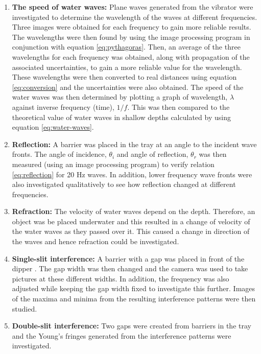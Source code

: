 \documentclass{article}
\begin{document}
\begin{enumerate}
  \item \textbf{The speed of water waves:} Plane waves generated from the vibrator were investigated to determine the wavelength of the waves at different frequencies. Three images were obtained for each frequency to gain more reliable results. The wavelengths were then found by using the image processing program in conjunction with equation \eqref{eq:pythagoras}. Then, an average of the three wavelengths for each frequency was obtained, along with propagation of the associated uncertainties, to gain a more reliable value for the wavelength. These wavelengths were then converted to real distances using equation \eqref{eq:conversion} and the uncertainties were also obtained. The speed of the water waves was then determined by plotting a graph of wavelength, $\lambda$ against inverse frequency (time), $1/f$. This was then compared to the theoretical value of water waves in shallow depths calculated by using equation \eqref{eq:water-waves}. 
  \item \textbf{Reflection:} A barrier was placed in the tray at an angle to the incident wave fronts. The angle of incidence, $\theta_i$ and angle of reflection, $\theta_r$ was then measured (using an image processing program) to verify relation \eqref{eq:reflection} for 20 Hz waves. In addition, lower frequency wave fronts were also investigated qualitatively to see how reflection changed at different frequencies.
  \item \textbf{Refraction:} The velocity of water waves depend on the depth. Therefore, an object was be placed underwater and this resulted in a change of velocity of the water waves as they passed over it. This caused a change in direction of the waves and hence refraction could be investigated.
  \item \textbf{Single-slit interference:} A barrier with a gap was placed in front of the dipper \cite{Paper01}. The gap width was then changed and the camera was used to take pictures at these different widths. In addition, the frequency was also adjusted while keeping the gap width fixed to investigate this further. Images of the maxima and minima from the resulting interference patterns were then studied.
  \item \textbf{Double-slit interference:} Two gaps were created from barriers in the tray and the Young's fringes generated from the interference patterns were investigated. 

\end{enumerate}
\end{document}
